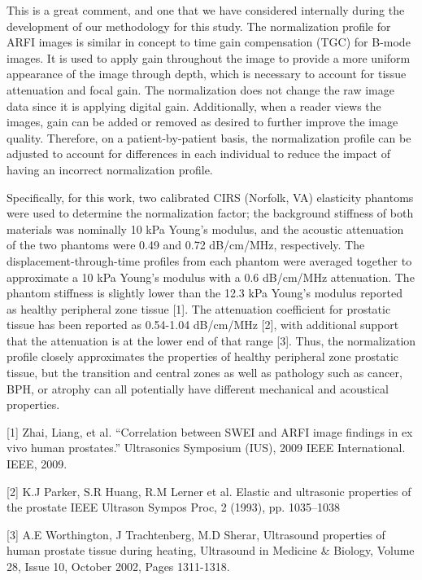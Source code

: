 \documentclass[10pt]{article}
\begin{document}
\begin{itemize}
    This is a great comment, and one that we have considered internally during
    the development of our methodology for this study.  The normalization
    profile for ARFI images is similar in concept to time gain compensation
    (TGC) for B-mode images. It is used to apply gain throughout the image to
    provide a more uniform appearance of the image through depth, which is
    necessary to account for tissue attenuation and focal gain. The
    normalization does not change the raw image data since it is applying
    digital gain. Additionally, when a reader views the images, gain can be
    added or removed as desired to further improve the image quality.
    Therefore, on a patient-by-patient basis, the normalization profile can be
    adjusted to account for differences in each individual to reduce the impact
    of having an incorrect normalization profile.

    Specifically, for this work, two calibrated CIRS (Norfolk, VA) elasticity
    phantoms were used to determine the normalization factor; the background
    stiffness of both materials was nominally 10 kPa Young's modulus, and the
    acoustic attenuation of the two phantoms were 0.49 and 0.72 dB/cm/MHz,
    respectively. The displacement-through-time profiles from each phantom were
    averaged together to approximate a 10 kPa Young's modulus with a 0.6
    dB/cm/MHz attenuation. The phantom stiffness is slightly lower than the
    12.3 kPa Young's modulus reported as healthy peripheral zone tissue [1].
    The attenuation coefficient for prostatic tissue has been reported as
    0.54-1.04 dB/cm/MHz [2], with additional support that the attenuation is at
    the lower end of that range [3]. Thus, the normalization profile closely
    approximates the properties of healthy peripheral zone prostatic tissue,
    but the transition and central zones as well as pathology such as cancer,
    BPH, or atrophy can all potentially have different mechanical and
    acoustical properties.

    [1] Zhai, Liang, et al. ``Correlation between SWEI and ARFI image findings
    in ex vivo human prostates.'' Ultrasonics Symposium (IUS), 2009 IEEE
    International. IEEE, 2009.

    [2] K.J Parker, S.R Huang, R.M Lerner et al. Elastic and ultrasonic
    properties of the prostate IEEE Ultrason Sympos Proc, 2 (1993), pp.
    1035–1038

    [3] A.E Worthington, J Trachtenberg, M.D Sherar, Ultrasound properties of
    human prostate tissue during heating, Ultrasound in Medicine \& Biology,
    Volume 28, Issue 10, October 2002, Pages 1311-1318.



\end{itemize}
\end{document}
